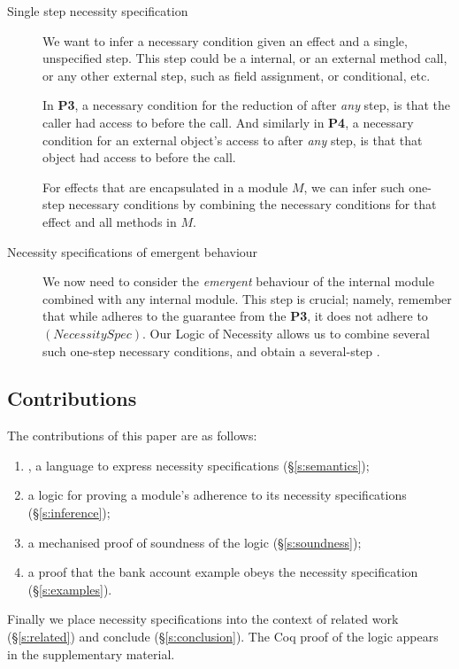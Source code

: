\begin{description}
  
\item[Single step necessity specification]
We want to infer
a necessary condition given an effect and
a single, unspecified step. This step could be a internal, or an external method call,
or any other external step, such as field assignment, or conditional, etc.

In \textbf{P3},   a necessary condition for the  reduction of   after \emph{any}
step, is that the caller  had access to  before the call.
And similarly in \textbf{P4},   a necessary condition for an external object's
access to   after \emph{any}
step, is that that object had access to  before the call.

For effects that are encapsulated in a module $M$, we can infer such one-step
necessary conditions by combining the necessary conditions for that effect and 
all   methods in $M$.



\item[Necessity specifications of emergent behaviour]
  
We now need to consider the \emph{emergent} behaviour of the internal module
combined with any internal module. This step is crucial; namely, remember that while  adheres to
the guarantee from the \textbf{P3}, it does not adhere to  $(NecessitySpec)$.   
Our Logic of Necessity allows us to combine  several such one-step necessary conditions, and obtain a several-step .
 
\end{description} 


\subsection{Contributions}

The contributions of this paper are as follows:
 
 \begin{enumerate}
 \item
\Chainmail, a language to
express necessity specifications (\S\ref{s:semantics});
 \item
a logic for proving a module's adherence to its
necessity specifications (\S\ref{s:inference});
\item
  a mechanised proof of soundness of the logic (\S\ref{s:soundness});
\item
  a proof that the bank account example obeys the necessity
  specification (\S\ref{s:examples}).
\end{enumerate}


\noindent Finally we place necessity specifications into the context
of related work (\S\ref{s:related}) and conclude (\S\ref{s:conclusion}).
The Coq proof of the logic appears in the
supplementary material.
